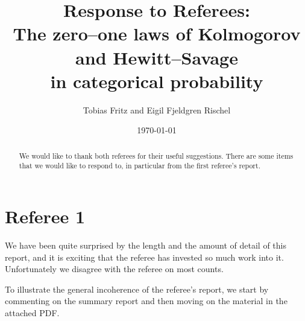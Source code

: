 \documentclass[11pt]{article}
\author{Tobias Fritz and Eigil Fjeldgren Rischel}
\title{Response to Referees:\\ The zero--one laws of Kolmogorov and Hewitt--Savage\\ in categorical probability}
\date{\today}
\begin{document}
\maketitle

\begin{abstract}
	We would like to thank both referees for their useful suggestions. There are some items that we would like to respond to, in particular from the first referee's report.
\end{abstract}

\section*{Referee 1}

We have been quite surprised by the length and the amount of detail of this report, and it is exciting that the referee has invested so much work into it. Unfortunately we disagree with the referee on most counts.


To illustrate the general incoherence of the referee's report, we start by commenting on the summary report and then moving on the material in the attached PDF.
\end{document}
